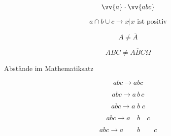 \documentclass[12pt,ngerman,parskip=full]{scrreprt}
\begin{document}
\[ \vv{a}  \cdot \vv{abc} \]

\[  a \cap b  \cup c \rightarrow {x | x \text{ ist positiv}} \]

\[ A \not= \overline{A} \]

\[ ABC \not= \overline{ABC}  \Omega \]

\clearpage

Abstände im Mathematiksatz

\[ a b c \rightarrow abc \]

\[ a b c \rightarrow a\,b\,c \]

\[ a b c \rightarrow a\;b\;c \]


\[ a b c \rightarrow a\quad b\quad c \]

\[ a b c \rightarrow a\qquad b\qquad c \]
\end{document}
